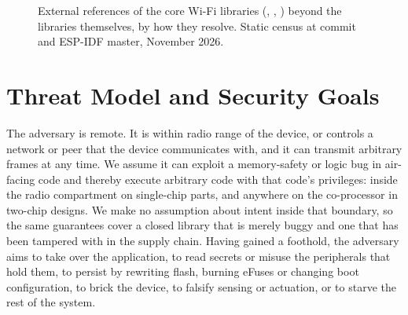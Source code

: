 \documentclass[conference,10pt]{IEEEtran}
\newcommand{\sym}[1]{\texttt{\detokenize{#1}}}
\begin{document}
\begin{figure}[t]
\centering
{}
\caption{External references of the core Wi-Fi libraries (\sym{libcore}, \sym{libnet80211}, \sym{libpp}) beyond the libraries themselves, by how they resolve. Static census at \sym{esp32-wifi-lib} commit \sym{07e8d01} and ESP-IDF master, November 2026.}
\label{fig:census}
\end{figure}

\section{Threat Model and Security Goals}
\label{sec:threat}

The adversary is remote. It is within radio range of the device, or controls a network or peer that the device communicates with, and it can transmit arbitrary frames at any time. We assume it can exploit a memory-safety or logic bug in air-facing code and thereby execute arbitrary code with that code's privileges: inside the radio compartment on single-chip parts, and anywhere on the co-processor in two-chip designs. We make no assumption about intent inside that boundary, so the same guarantees cover a closed library that is merely buggy and one that has been tampered with in the supply chain. Having gained a foothold, the adversary aims to take over the application, to read secrets or misuse the peripherals that hold them, to persist by rewriting flash, burning eFuses or changing boot configuration, to brick the device, to falsify sensing or actuation, or to starve the rest of the system.
\end{document}
